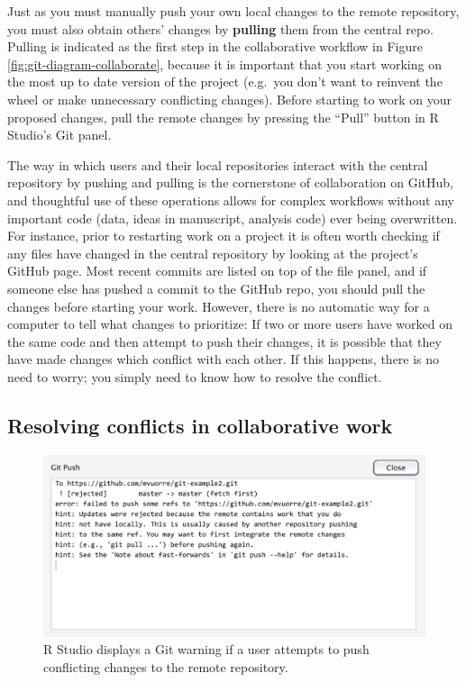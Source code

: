 \documentclass[
  american,
  ,doc,floatsintext]{apa6}
\begin{document}
Just as you must manually push your own local changes to the remote repository, you must also obtain others' changes by \textbf{pulling} them from the central repo. Pulling is indicated as the first step in the collaborative workflow in Figure \ref{fig:git-diagram-collaborate}, because it is important that you start working on the most up to date version of the project (e.g.~you don't want to reinvent the wheel or make unnecessary conflicting changes). Before starting to work on your proposed changes, pull the remote changes by pressing the \enquote{Pull} button in R Studio's Git panel.

The way in which users and their local repositories interact with the central repository by pushing and pulling is the cornerstone of collaboration on GitHub, and thoughtful use of these operations allows for complex workflows without any important code (data, ideas in manuscript, analysis code) ever being overwritten. For instance, prior to restarting work on a project it is often worth checking if any files have changed in the central repository by looking at the project's GitHub page. Most recent commits are listed on top of the file panel, and if someone else has pushed a commit to the GitHub repo, you should pull the changes before starting your work. However, there is no automatic way for a computer to tell what changes to prioritize: If two or more users have worked on the same code and then attempt to push their changes, it is possible that they have made changes which conflict with each other. If this happens, there is no need to worry; you simply need to know how to resolve the conflict.

\hypertarget{resolving-conflicts-in-collaborative-work}{%
\subsection{Resolving conflicts in collaborative work}\label{resolving-conflicts-in-collaborative-work}}

\begin{figure}

{\centering \includegraphics{images/rstudio-push-rejected} 

}

\caption{R Studio displays a Git warning if a user attempts to push conflicting changes to the remote repository.}\label{fig:rstudio-push-rejected}
\end{figure}
\end{document}
